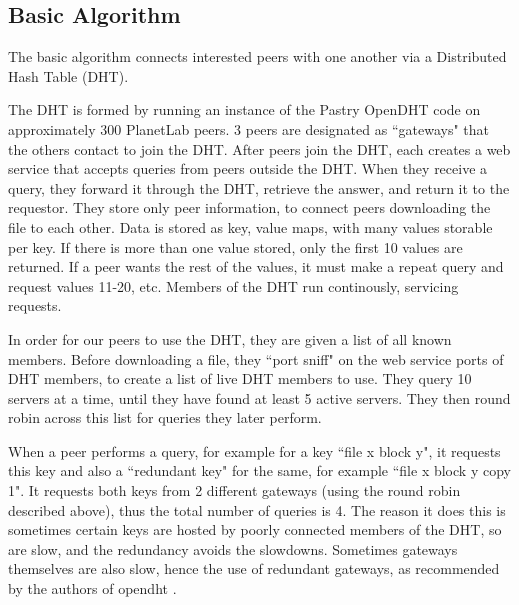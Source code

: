 \subsection{Basic Algorithm}

The basic algorithm connects interested peers with one another via a Distributed Hash Table (DHT).

The DHT is formed by running an instance of the Pastry OpenDHT code on approximately 300 PlanetLab peers.  3 peers are designated as ``gateways" that the others
contact to join the DHT.  After peers join the DHT, each creates a web service that accepts queries from peers outside the DHT.  When they receive a
query, they forward it through the DHT, retrieve the answer, and return it to the requestor. They store only peer information, to connect peers downloading the file to each other.
Data is stored as key, value maps, with many values storable per key.  If there is more than one value stored, only the first 10 values are returned. 
If a peer wants the rest of the values, it must make a repeat query and request values 11-20, etc.  Members of the DHT run continously, servicing requests.

In order for our peers to use the DHT, they are given a list of all known members.  Before downloading a file, they ``port sniff" on the web service ports of
DHT members, to create a list of live DHT members to use.  They query 10 servers at a time, until they have found at least 5 active servers.
They then round robin across this list for queries they later perform.

When a peer performs a query, for example for a key ``file x block y", it requests this key and also a ``redundant key" for the same, 
for example ``file x block y copy 1".  It requests both keys from 2 different gateways (using the round robin described above), 
thus the total number of queries is 4.  
The reason it does this is sometimes certain keys are hosted by poorly connected members of the DHT, so are slow, and the redundancy avoids the slowdowns.
Sometimes gateways themselves are also slow, hence the use of redundant gateways, as recommended by the authors of opendht \cite{opendht_speed}.

